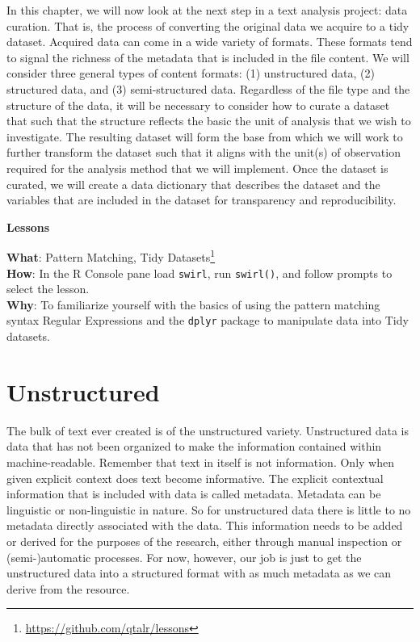 \documentclass[
  letterpaper,
  DIV=11,
  numbers=noendperiod]{scrreprt}
\theoremstyle{definition}
\theoremstyle{remark}
\DeclareRobustCommand{\href}[2]{#2\footnote{\url{#1}}}
\begin{document}
In this chapter, we will now look at the next step in a text analysis
project: data curation. That is, the process of converting the original
data we acquire to a tidy dataset. Acquired data can come in a wide
variety of formats. These formats tend to signal the richness of the
metadata that is included in the file content. We will consider three
general types of content formats: (1) unstructured data, (2) structured
data, and (3) semi-structured data. Regardless of the file type and the
structure of the data, it will be necessary to consider how to curate a
dataset that such that the structure reflects the basic the unit of
analysis that we wish to investigate. The resulting dataset will form
the base from which we will work to further transform the dataset such
that it aligns with the unit(s) of observation required for the analysis
method that we will implement. Once the dataset is curated, we will
create a data dictionary that describes the dataset and the variables
that are included in the dataset for transparency and reproducibility.

\begin{tcolorbox}[enhanced jigsaw, leftrule=.75mm, colframe=quarto-callout-color-frame, colback=white, rightrule=.15mm, opacityback=0, arc=.35mm, breakable, bottomrule=.15mm, left=2mm, toprule=.15mm]

\textbf{ Lessons}

\textbf{What}: \href{https://github.com/qtalr/lessons}{Pattern Matching,
Tidy Datasets}\\
\textbf{How}: In the R Console pane load \texttt{swirl}, run
\texttt{swirl()}, and follow prompts to select the lesson.\\
\textbf{Why}: To familiarize yourself with the basics of using the
pattern matching syntax Regular Expressions and the \texttt{dplyr}
package to manipulate data into Tidy datasets.

\end{tcolorbox}

\section{Unstructured}\label{unstructured}

The bulk of text ever created is of the unstructured variety.
Unstructured data is data that has not been organized to make the
information contained within machine-readable. Remember that text in
itself is not information. Only when given explicit context does text
become informative. The explicit contextual information that is included
with data is called metadata. Metadata can be linguistic or
non-linguistic in nature. So for unstructured data there is little to no
metadata directly associated with the data. This information needs to be
added or derived for the purposes of the research, either through manual
inspection or (semi-)automatic processes. For now, however, our job is
just to get the unstructured data into a structured format with as much
metadata as we can derive from the resource.
\end{document}
